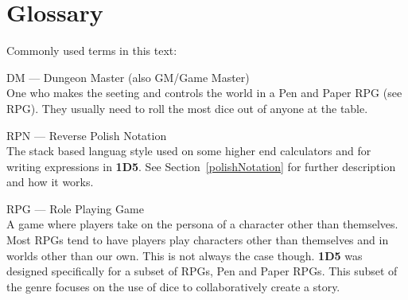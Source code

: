\chapter{Glossary}
\label{glossary}
Commonly used terms in this text:

\noindent \hangindent=1cm
DM --- Dungeon Master (also GM/Game Master)\\
 
One who makes the seeting and controls the world in a Pen and Paper RPG
(see RPG). They usually need to roll the most dice out of anyone at the table.

\noindent \hangindent=1cm
RPN --- Reverse Polish Notation\\
The stack based languag style used on some higher end calculators and for
writing expressions in {\bf 1D5}. See Section~\ref{polishNotation} for further
description and how it works.

\noindent \hangindent=1cm
RPG --- Role Playing Game\\
A game where players take on the persona of a character other than themselves.
Most RPGs tend to have players play characters other than themselves and in 
worlds other than our own. This is not always the case though. {\bf 1D5} was
designed specifically for a subset of RPGs, Pen and Paper RPGs. This subset
of the genre focuses on the use of dice to collaboratively create a story.
